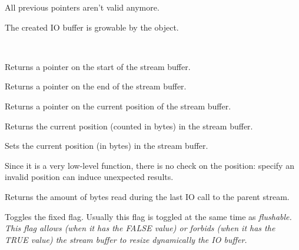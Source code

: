All previous pointers aren't valid anymore.


The created IO buffer is growable by the object.


\\



Returns a pointer on the start of the stream buffer.



Returns a pointer on the end of the stream buffer.



Returns a pointer on the current position of the stream buffer.



Returns the current position (counted in bytes) in the stream buffer.



Sets the current position (in bytes) in the stream buffer.


Since it is a very low-level function, there is no check on the position:
specify an invalid position can induce unexpected results.



Returns the amount of bytes read during the last IO call to the parent stream.

\label{wxstreambufferfixed}


Toggles the fixed flag. Usually this flag is toggled at the same time as 
\it{flushable}. This flag allows (when it has the FALSE value) or forbids
(when it has the TRUE value) the stream buffer to resize dynamically the IO buffer.

